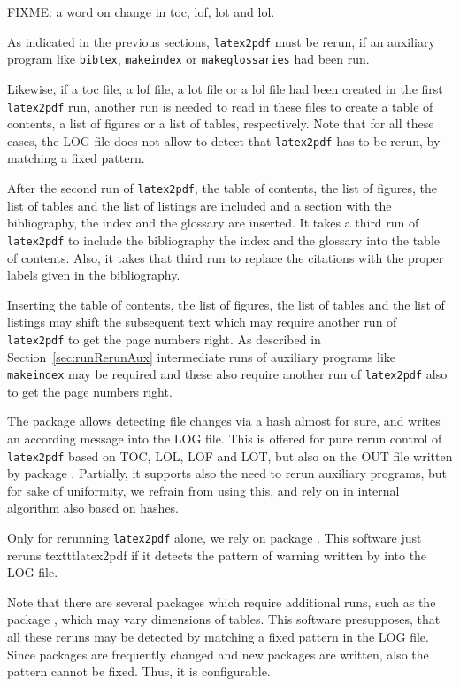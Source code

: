 FIXME\@: a word on change in toc, lof, lot and lol. 

As indicated in the previous sections, 
\texttt{latex2pdf} must be rerun, 
if an auxiliary program like \texttt{bibtex}, \texttt{makeindex} 
or \texttt{makeglossaries} 
had been run. 

Likewise, if a toc file, a lof file, a lot file or a lol file
had been created in the first \texttt{latex2pdf} run, 
another run is needed to read in these files 
to create a table of contents, a list of figures or a list of tables, 
respectively. 
Note that for all these cases, 
the LOG file does not allow to detect that \texttt{latex2pdf} has to be rerun, 
by matching a fixed pattern. 

After the second run of \texttt{latex2pdf}, 
the table of contents,
the list of figures, the list of tables and the list of listings 
are included and a section with the bibliography, 
the index and the glossary are inserted. 
It takes a third run of \texttt{latex2pdf} 
to include the bibliography the index and the glossary 
into the table of contents. 
Also, it takes that third run to replace the citations 
with the proper labels given in the bibliography. 

Inserting the table of contents,
the list of figures, the list of tables and the list of listings 
may shift the subsequent text 
which may require another run of \texttt{latex2pdf} 
to get the page numbers right. 
As described in Section~\ref{sec:runRerunAux} 
intermediate runs of auxiliary programs like \texttt{makeindex} 
may be required 
and these also require another run of \texttt{latex2pdf} 
also to get the page numbers right. 

The package  allows detecting file changes via a hash 
almost for sure, and writes an according message into the LOG file. 
This is offered for pure rerun control of \texttt{latex2pdf} 
based on TOC, LOL, LOF and LOT, but also on the OUT file written by package . 
Partially, it supports also the need to rerun auxiliary programs, 
but for sake of uniformity, we refrain from using this, 
and rely on in internal algorithm also based on hashes. 

Only for rerunning \texttt{latex2pdf} alone, we rely on package . 
This software just reruns texttt{latex2pdf} 
if it detects the pattern of warning written by  into the LOG file. 



Note that there are several packages which require additional runs, 
such as the package , 
which may vary dimensions of tables. 
This software presupposes, that all these reruns 
may be detected by matching a fixed pattern in the LOG file. 
Since packages are frequently changed and new packages are written, 
also the pattern cannot be fixed. 
Thus, it is configurable. 
 
